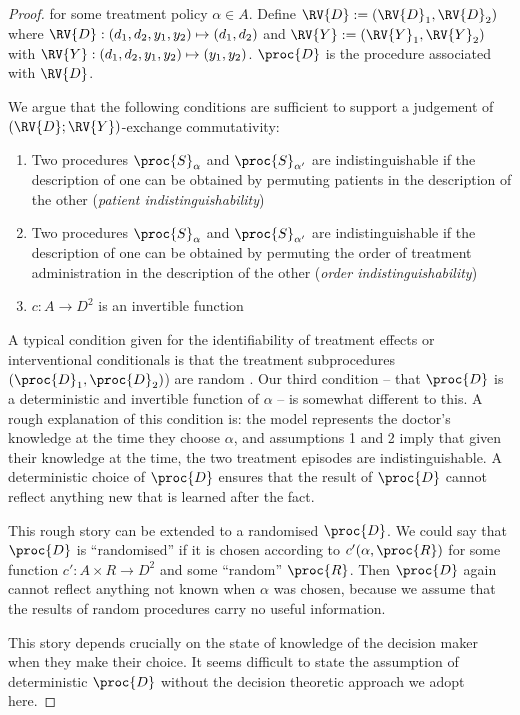 \begin{proof}
for some treatment policy $\alpha\in A$. Define $\RV{D}:=(\RV{D}_1,\RV{D}_2)$ where $\RV{D}:(d_1,d_2,y_1,y_2)\mapsto (d_1,d_2)$ and $\RV{Y}:=(\RV{Y}_1,\RV{Y}_2)$ with $\RV{Y}:(d_1,d_2,y_1,y_2)\mapsto (y_1,y_2)$. $\proc{D}$ is the procedure associated with $\RV{D}$.

We argue that the following conditions are sufficient to support a judgement of $(\RV{D};\RV{Y})$-exchange commutativity:

\begin{enumerate}
    \item Two procedures $\proc{S}_\alpha$ and $\proc{S}_{\alpha'}$ are indistinguishable if the description of one can be obtained by permuting patients in the description of the other (\emph{patient indistinguishability})
    \item Two procedures $\proc{S}_\alpha$ and $\proc{S}_{\alpha'}$ are indistinguishable if the description of one can be obtained by permuting the order of treatment administration in the description of the other (\emph{order indistinguishability})
    \item $c:A\to D^2$ is an invertible function
\end{enumerate}

A typical condition given for the identifiability of treatment effects or interventional conditionals is that the treatment subprocedures $(\proc{D}_1,\proc{D}_2)$) are random \citep{rubin_causal_2005}. Our third condition -- that $\proc{D}$ is a deterministic and invertible function of $\alpha$ -- is somewhat different to this. A rough explanation of this condition is: the model represents the doctor's knowledge at the time they choose $\alpha$, and assumptions 1 and 2 imply that given their knowledge at the time, the two treatment episodes are indistinguishable. A deterministic choice of $\proc{D}$ ensures that the result of $\proc{D}$ cannot reflect anything new that is learned after the fact.

This rough story can be extended to a randomised $\proc{D}$. We could say that $\proc{D}$ is ``randomised'' if it is chosen according to $c'(\alpha,\proc{R})$ for some function $c':A\times R\to D^2$ and some ``random'' $\proc{R}$. Then $\proc{D}$ again cannot reflect anything not known when $\alpha$ was chosen, because we assume that the results of random procedures carry no useful information.

This story depends crucially on the state of knowledge of the decision maker when they make their choice. It seems difficult to state the assumption of deterministic $\proc{D}$ without the decision theoretic approach we adopt here.


\end{proof}
